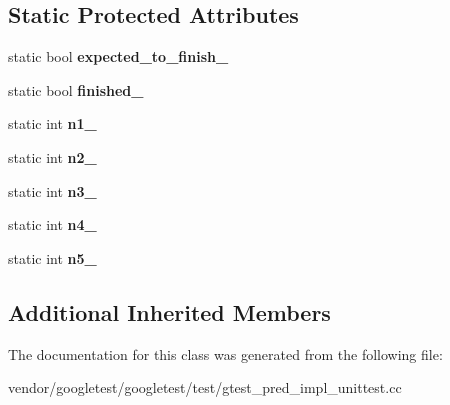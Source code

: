 \subsection*{Static Protected Attributes}
\begin{DoxyCompactItemize}
\item 
\mbox{\label{class_predicate5_test_aa502b7a330cc5c64785ff59aad3ef180}} 
static bool {\bfseries expected\+\_\+to\+\_\+finish\+\_\+}
\item 
\mbox{\label{class_predicate5_test_a5003aada64accf06cdb28b1ff1797353}} 
static bool {\bfseries finished\+\_\+}
\item 
\mbox{\label{class_predicate5_test_a356c8e361185b234a417ed895eb14e38}} 
static int {\bfseries n1\+\_\+}
\item 
\mbox{\label{class_predicate5_test_a5bf48ba65b7baf20abe1d2af90779ce0}} 
static int {\bfseries n2\+\_\+}
\item 
\mbox{\label{class_predicate5_test_a63723efb915dbf418c31b97b64dabc0e}} 
static int {\bfseries n3\+\_\+}
\item 
\mbox{\label{class_predicate5_test_a5d66aa58badddc8d3d8070a93c0558d6}} 
static int {\bfseries n4\+\_\+}
\item 
\mbox{\label{class_predicate5_test_a96badba6366235a2771b27ea014bd9ce}} 
static int {\bfseries n5\+\_\+}
\end{DoxyCompactItemize}
\subsection*{Additional Inherited Members}


The documentation for this class was generated from the following file\+:\begin{DoxyCompactItemize}
\item 
vendor/googletest/googletest/test/gtest\+\_\+pred\+\_\+impl\+\_\+unittest.\+cc\end{DoxyCompactItemize}
